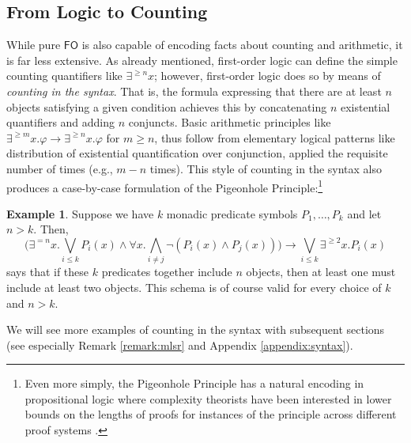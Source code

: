 \documentclass[12pt,oneside,reqno]{amsart}
\theoremstyle{definition}
\newtheorem{example}{Example}
\begin{document}
\subsection{From Logic to Counting}
While pure $\mathsf{FO}$ is also capable of encoding facts about counting and arithmetic, it is far less extensive. As already mentioned, first-order logic can define the simple counting quantifiers like $\exists ^{\geq n}x$; however, first-order logic does so by means of \emph{counting in the syntax}. That is, the formula expressing that there are at least $n$ objects satisfying a given condition achieves this by concatenating $n$ existential quantifiers and adding $n$ conjuncts. Basic arithmetic principles like $\exists^{\geq m}x.\varphi \rightarrow \exists^{\geq n}x.\varphi$ for $m\geq n$, thus follow from elementary logical patterns like distribution of existential quantification over conjunction, applied the requisite number of times (e.g., $m-n$ times). This style of counting in the syntax also produces a case-by-case formulation of the Pigeonhole Principle:\footnote{Even more simply, the Pigeonhole Principle has a natural encoding in propositional logic where complexity theorists have been interested in lower bounds on the lengths of proofs for instances of the principle across different proof systems \citep{cook_reckhow_1979,Krajicek}.}
\begin{example} \label{example:php} Suppose we have $k$ monadic predicate symbols $P_1,\dots,P_k$ and let $n>k$. Then, 
 \begin{equation} \label{eq:fophp}\big( \exists^{= n}x. \bigvee_{i \leq k} P_i(x) \wedge \forall x. \bigwedge_{i \neq j} \neg (P_i(x) \wedge P_j(x)) \big)\rightarrow \bigvee_{i \leq k} \exists^{\geq 2}x. P_i(x) \end{equation}
says that if these $k$ predicates together include $n$ objects, then at least one must include at least two objects. This schema is of course valid for every choice of $k$ and $n>k$.
\end{example}
We will see more examples of counting in the syntax with subsequent sections  (see especially  Remark \ref{remark:mlsr} and Appendix \ref{appendix:syntax}). 
\end{document}
